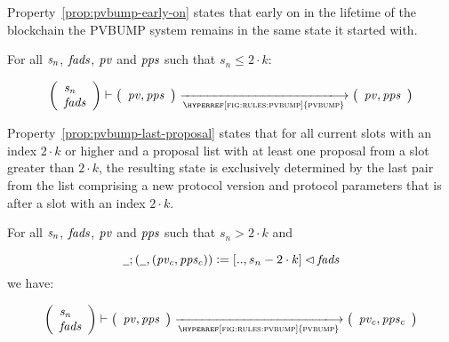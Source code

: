 Property~\ref{prop:pvbump-early-on} states that early on in the lifetime
of the blockchain the PVBUMP system remains in the same state it started with.

\begin{property}\label{prop:pvbump-early-on}
  \textrm{For all $\mathit{s_n}$, $\mathit{fads}$, $\mathit{pv}$ and $\mathit{pps}$ such
    that $s_n \leq 2 \cdot k$:}

  $$
  \left(
    \begin{array}{l}
      \var{s_n}\\
      \var{fads}
    \end{array}
  \right)
  \vdash
  \left(
    \begin{array}{l}
      \var{pv}, \var{pps}\\
    \end{array}
  \right)
  \trans{\hyperref[fig:rules:pvbump]{pvbump}}{}
  \left(
    \begin{array}{l}
      \var{pv}, \var{pps}\\
    \end{array}
  \right)
  $$
\end{property}

Property~\ref{prop:pvbump-last-proposal} states that for all current slots
with an index $2 \cdot k$ or higher and a proposal list with at least one
proposal from a slot greater than $2 \cdot k$, the resulting state is
exclusively determined by the last pair from the list comprising a new
protocol version and protocol parameters that is after a slot with an index
$2 \cdot k$.

\begin{property}\label{prop:pvbump-last-proposal}
  \textrm{For all $\mathit{s_n}$, $\mathit{fads}$, $\mathit{pv}$ and $\mathit{pps}$ such
    that $s_n > 2 \cdot k$ and}

  $$
  \wcard ; (\wcard , (\var{pv_c}, \var{pps_c})) \leteq [.., s_n - 2 \cdot k]
  \restrictdom \var{fads}
  $$
  \textrm{ we have: }

  $$
  \left(
    \begin{array}{l}
      \var{s_n}\\
      \var{fads}
    \end{array}
  \right)
  \vdash
  \left(
    \begin{array}{l}
      \var{pv}, \var{pps}\\
    \end{array}
  \right)
  \trans{\hyperref[fig:rules:pvbump]{pvbump}}{}
  \left(
    \begin{array}{l}
      \var{pv_c}, \var{pps_c}\\
    \end{array}
  \right)
  $$
\end{property}